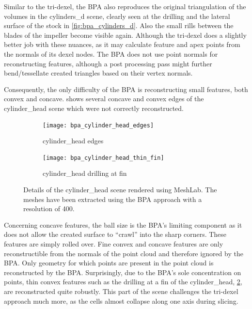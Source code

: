 Similar to the tri-dexel, the BPA also reproduces the original triangulation of the volumes in the cylinders\_d scene, clearly seen at the drilling and the lateral surface of the stock in \cref{fig:bpa_cylinders_d}.
Also the small rills between the blades of the impeller become visible again.
Although the tri-dexel does a slightly better job with these nuances, as it may calculate feature and apex points from the normals of its dexel nodes.
The BPA does not use point normals for reconstructing features, although a post processing pass might \eg further bend/tessellate created triangles based on their vertex normals.

Consequently, the only difficulty of the BPA is reconstructing small features, both convex and concave.
 shows several concave and convex edges of the cylinder\_head scene which were not correctly reconstructed.
%
\begin{figure}
	\centering
	\begin{subfigure}[b]{0.49\textwidth}
		\centering
		\texttt{[image: bpa\_cylinder\_head\_edges]}
		\caption{cylinder\_head edges}
		\label{fig:bpa_cylinder_head_edges}
	\end{subfigure}
	\begin{subfigure}[b]{0.49\textwidth}
		\centering
		\texttt{[image: bpa\_cylinder\_head\_thin\_fin]}
		\caption{cylinder\_head drilling at fin}
		\label{fig:bpa_cylinder_head_thin_fin}
	\end{subfigure}
	\caption{
		Details of the cylinder\_head scene rendered using MeshLab.
		The meshes have been extracted using the BPA approach with a resolution of 400.
	}
	\label{fig:bpa_cylinder_head_details}
\end{figure}
%
Concerning concave features, the ball size is the BPA's limiting component as it does not allow the created surface to \enquote{crawl} into the sharp corners.
These features are simply rolled over.
Fine convex and concave features are only reconstructible from the normals of the point cloud and therefore ignored by the BPA.
Only geometry for which points are present in the point cloud is reconstructed by the BPA.
Surprisingly, due to the BPA's sole concentration on points, thin convex features such as the drilling at a fin of the cylinder\_head, \cf \cref{fig:bpa_cylinder_head_thin_fin}, are reconstructed quite robustly.
This part of the scene challenges the tri-dexel approach much more, as the cells almost collapse along one axis during slicing.

